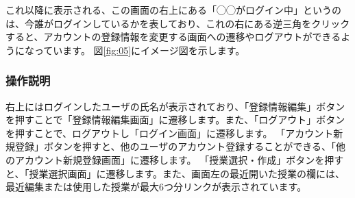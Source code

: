 これ以降に表示される、この画面の右上にある「◯◯がログイン中」というのは、今誰がログインしているかを表しており、これの右にある逆三角をクリックすると、アカウントの登録情報を変更する画面への遷移やログアウトができるようになっています。
図\ref{fig:05}にイメージ図を示します。

\subsubsection{操作説明}
右上にはログインしたユーザの氏名が表示されており、「登録情報編集」ボタンを押すことで「登録情報編集画面」に遷移します。また、「ログアウト」ボタンを押すことで、ログアウトし「ログイン画面」に遷移します。
「アカウント新規登録」ボタンを押すと、他のユーザのアカウント登録することができる、「他のアカウント新規登録画面」に遷移します。
「授業選択・作成」ボタンを押すと、「授業選択画面」に遷移します。また、画面左の最近開いた授業の欄には、最近編集または使用した授業が最大6つ分リンクが表示されています。



